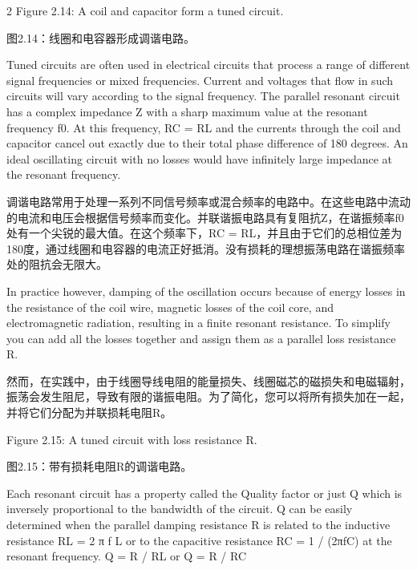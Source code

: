 \documentclass{ctexbook}
\begin{document}
\begin{paracol}{2}
Figure 2.14: A coil and capacitor form a tuned circuit. 

\switchcolumn

图2.14：线圈和电容器形成调谐电路。

\switchcolumn*

Tuned circuits are often used in electrical circuits that process a range of different signal 
frequencies or mixed frequencies. Current and voltages that flow in such circuits will vary 
according to the signal frequency. The parallel resonant circuit has a complex impedance 
Z with a sharp maximum value at the resonant frequency f0. At this frequency, RC = RL 
and the currents through the coil and capacitor cancel out exactly due to their total phase 
difference of 180 degrees. An ideal oscillating circuit with no losses would have infinitely 
large impedance at the resonant frequency. 

\switchcolumn

调谐电路常用于处理一系列不同信号频率或混合频率的电路中。在这些电路中流动的电流和电压会根据信号频率而变化。并联谐振电路具有复阻抗Z，在谐振频率f0处有一个尖锐的最大值。在这个频率下，RC = RL，并且由于它们的总相位差为180度，通过线圈和电容器的电流正好抵消。没有损耗的理想振荡电路在谐振频率处的阻抗会无限大。

\switchcolumn*

In practice however, damping of the oscillation occurs because of energy losses in the resistance of the coil wire, magnetic losses of the coil core, and electromagnetic radiation, 
resulting in a finite resonant resistance. To simplify you can add all the losses together and 
assign them as a parallel loss resistance R. 

\switchcolumn

然而，在实践中，由于线圈导线电阻的能量损失、线圈磁芯的磁损失和电磁辐射，振荡会发生阻尼，导致有限的谐振电阻。为了简化，您可以将所有损失加在一起，并将它们分配为并联损耗电阻R。

\switchcolumn*

Figure 2.15: A tuned circuit with loss resistance R. 

\switchcolumn

图2.15：带有损耗电阻R的调谐电路。

\switchcolumn*

Each resonant circuit has a property called the Quality factor or just Q which is inversely 
proportional to the bandwidth of the circuit. Q can be easily determined when the parallel 
damping resistance R is related to the inductive resistance RL = 2 π f L or to the capacitive 
resistance RC = 1 / (2πfC) at the resonant frequency. 
Q = R / RL or Q = R / RC 


\end{paracol}
\end{document}
